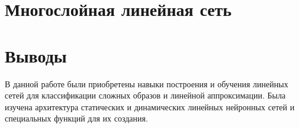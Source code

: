 \section{Многослойная линейная сеть}


\section{Выводы}

В данной работе были приобретены навыки построения и обучения линейных сетей для классификации сложных образов и линейной аппроксимации. Была изучена архитектура статических и динамических линейных нейронных сетей и специальных функций для их создания.

